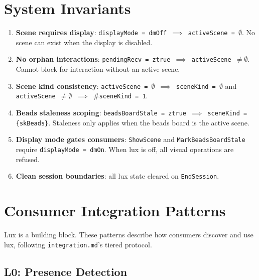 \documentclass[a4paper,10pt,fleqn]{article}
\begin{document}
\section{System Invariants}

\begin{enumerate}
  \item \textbf{Scene requires display}: \texttt{displayMode = dmOff
    $\implies$ activeScene = $\emptyset$}. No scene can exist when the
    display is disabled.

  \item \textbf{No orphan interactions}: \texttt{pendingRecv = ztrue
    $\implies$ activeScene $\neq \emptyset$}. Cannot block for
    interaction without an active scene.

  \item \textbf{Scene kind consistency}: \texttt{activeScene = $\emptyset$
    $\implies$ sceneKind = $\emptyset$} and
    \texttt{activeScene $\neq \emptyset$ $\implies$ $\#$sceneKind = 1}.

  \item \textbf{Beads staleness scoping}: \texttt{beadsBoardStale = ztrue
    $\implies$ sceneKind = \{skBeads\}}. Staleness only applies when the
    beads board is the active scene.

  \item \textbf{Display mode gates consumers}: \texttt{ShowScene} and
    \texttt{MarkBeadsBoardStale} require \texttt{displayMode = dmOn}.
    When lux is off, all visual operations are refused.

  \item \textbf{Clean session boundaries}: all lux state cleared on
    \texttt{EndSession}.
\end{enumerate}

\section{Consumer Integration Patterns}

Lux is a building block. These patterns describe how consumers
discover and use lux, following \texttt{integration.md}'s tiered
protocol.

\subsection{L0: Presence Detection}
\end{document}
